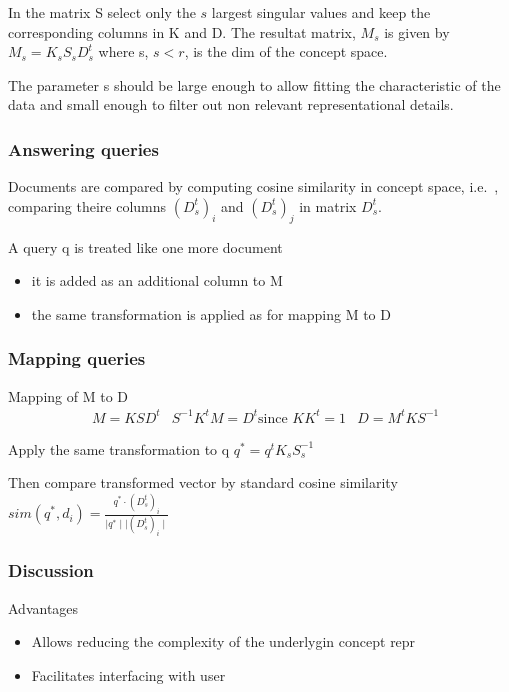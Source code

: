In the matrix S select only the $ s $ largest singular values and keep
the corresponding columns in K and D.
The resultat matrix, $ M_s $ is given by $ M_s = K_s S_s D_s^t $ where
s, $ s < r $, is the dim of the concept space.

The parameter s should be large enough to allow fitting the
characteristic of the data and small enough to filter out non relevant
representational details.

\subsubsection{Answering queries}

Documents are compared by computing cosine similarity in concept
space, i.e.\ , comparing theire columns $ (D_s^t)_i $ and $ (D_s^t)_j
$ in matrix $ D_s^t $.

A query q is treated like one more document
\begin{itemize}
\item it is added as an additional column to M
\item the same transformation is applied as for mapping M  to D
\end{itemize}

\subsubsection{Mapping queries}

Mapping of M to D
\begin{align*}
  &M = K S D^t
  &S^{-1} K^t M = D^t \text{since }KK^t = 1
  &D = M^t K S^{-1}
\end{align*}

Apply the same transformation to q
$ q^* = q^t K_s S_s^{-1} $

Then compare transformed vector by standard cosine similarity
$ sim(q^*, d_i) = \frac{q^* \cdot (D_s^t)_i}{\mid q^* \mid \mid
  (D_s^t)_i \mid}  $

\subsubsection{Discussion}

Advantages
\begin{itemize}
\item Allows reducing the complexity of the underlygin concept repr
\item Facilitates interfacing with user
\end{itemize}


